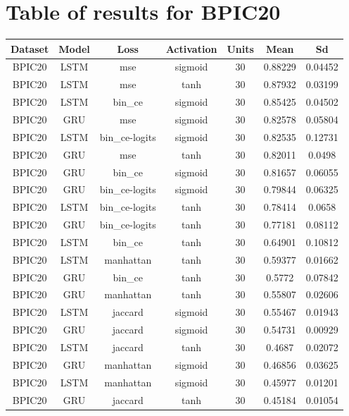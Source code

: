 \documentclass{article}%
\begin{document}
\section{Table of results for BPIC20}%
\label{sec:TableofresultsforBPIC20}%
\begin{longtable}{|c|c|c|c|c|c|c|}%
\hline%
\rowcolor{lightgray!70}%
\textbf{Dataset}&\textbf{Model}&\textbf{Loss}&\textbf{Activation}&\textbf{Units}&\textbf{Mean}&\textbf{Sd}\\%
\hline%
BPIC20&LSTM&mse&sigmoid&30&0.88229&0.04452\\%
\hline%
BPIC20&LSTM&mse&tanh&30&0.87932&0.03199\\%
\hline%
BPIC20&LSTM&bin\_ce&sigmoid&30&0.85425&0.04502\\%
\hline%
BPIC20&GRU&mse&sigmoid&30&0.82578&0.05804\\%
\hline%
BPIC20&LSTM&bin\_ce{-}logits&sigmoid&30&0.82535&0.12731\\%
\hline%
BPIC20&GRU&mse&tanh&30&0.82011&0.0498\\%
\hline%
BPIC20&GRU&bin\_ce&sigmoid&30&0.81657&0.06055\\%
\hline%
BPIC20&GRU&bin\_ce{-}logits&sigmoid&30&0.79844&0.06325\\%
\hline%
BPIC20&LSTM&bin\_ce{-}logits&tanh&30&0.78414&0.0658\\%
\hline%
BPIC20&GRU&bin\_ce{-}logits&tanh&30&0.77181&0.08112\\%
\hline%
BPIC20&LSTM&bin\_ce&tanh&30&0.64901&0.10812\\%
\hline%
BPIC20&LSTM&manhattan&tanh&30&0.59377&0.01662\\%
\hline%
BPIC20&GRU&bin\_ce&tanh&30&0.5772&0.07842\\%
\hline%
BPIC20&GRU&manhattan&tanh&30&0.55807&0.02606\\%
\hline%
BPIC20&LSTM&jaccard&sigmoid&30&0.55467&0.01943\\%
\hline%
BPIC20&GRU&jaccard&sigmoid&30&0.54731&0.00929\\%
\hline%
BPIC20&LSTM&jaccard&tanh&30&0.4687&0.02072\\%
\hline%
BPIC20&GRU&manhattan&sigmoid&30&0.46856&0.03625\\%
\hline%
BPIC20&LSTM&manhattan&sigmoid&30&0.45977&0.01201\\%
\hline%
BPIC20&GRU&jaccard&tanh&30&0.45184&0.01054\\%
\hline%
\end{longtable}

%
\newpage%
\end{document}
